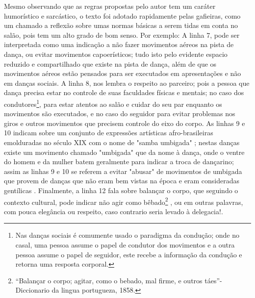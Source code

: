 Mesmo observando que as regras propostas pelo autor tem um caráter humorístico e sarcástico,
o texto foi adotado rapidamente pelas gafieiras, como um chamado a reflexão sobre umas
normas básicas a serem tidas em conta no salão, pois tem um alto grado de bom senso. Por exemplo: 
A linha 7, pode ser interpretada como uma indicação a 
não fazer movimentos aéreos na pista de dança,
ou  evitar movimentos capoerísticos; tudo isto
pelo evidente espacio reduzido e compartilhado que existe na pista de dança, 
além de que os movimentos aéreos estão pensados para ser
executados em apresentações e não em danças sociais. 
A linha 8, nos lembra o respeito ao parceiro; pois a pessoa que dança precisa
estar no controle de suas faculdades físicas e mentais; 
no caso dos condutores\footnote{\label{footlab:conducao}Nas danças sociais é comumente usado o paradigma da condução; 
onde no casal, uma pessoa assume o papel de condutor dos movimentos e 
a outra pessoa assume o papel de seguidor, este recebe a informação da condução e retorna uma resposta corporal.}, 
para estar atentos ao salão e cuidar do seu par enquanto os movimentos são executados, 
e no caso do seguidor para evitar problemas
nos giros e outros movimentos que precisem  controle do eixo do corpo.
As linhas 9 e 10 indicam sobre um conjunto de expressões artísticas 
afro-brasileiras emolduradas no século XIX com o nome de "samba umbigada" \cite[pp. 47]{diniz2008almanaque} \cite[pp. 85]{sandroni2001feitico}; nestas danças existe
um movimento chamado "umbigada" \cite{da2015historia} que da nome à dança, onde o ventre do homem e da mulher batem geralmente para indicar
a troca de dançarino; assim as linhas 9 e 10 se referem a
 evitar "abusar" de movimentos de umbigada que provem de danças que não eram bem vistas na época e eram consideradas gentílicas \cite[pp. 85]{sandroni2001feitico}.
Finalmente,
a linha 12 fala sobre balançar o corpo, que seguindo o contexto cultural, 
pode indicar não agir como bêbado\footnote{``Balançar o corpo; agitar, como o bebado, mal firme, e outros táes''-Diccionario da lingua portugueza, 1858.} \cite[pp.296]{diccionario1858}, ou em outras palavras,
com pouca elegância ou respeito,
caso contrario seria levado à delegacia!.


